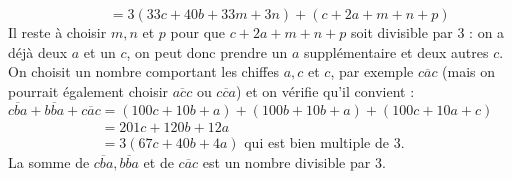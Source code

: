 \begin{enumerate}
\begin{enumerate}
               $\phantom{\overline{cba}+\overline{bba}+\overline{mnp}} =3(33c+40b+33m+3n)+(c+2a+m+n+p)$ \\
               Il reste à choisir $m, n$ et $p$ pour que $c+2a+m+n+p$ soit divisible par 3 : on a déjà deux $a$ et un $c$, on peut donc prendre un $a$ supplémentaire et deux autres $c$. On choisit un nombre comportant les chiffes $a, c$ et $c$, par exemple $\overline{cac}$ (mais on pourrait également choisir $\overline{acc}$ ou $\overline{cca}$) et on vérifie qu'il convient : \\
               $\overline{cba}+\overline{bba}+\overline{cac} =(100c+10b+a)+(100b+10b+a)+(100c+10a+c)$ \\
               $\phantom{\overline{cba}+\overline{bba}+\overline{cac}} =201c+120b+12a$ \\
               $\phantom{\overline{cba}+\overline{bba}+\overline{cac}} =3(67c+40b+4a)$ qui est bien multiple de 3. \\
                {\blue La somme de $\overline{cba}, \overline{bba}$ et de $\overline{cac}$ est un nombre divisible par 3.}
      \end{enumerate}
   \end{enumerate}
